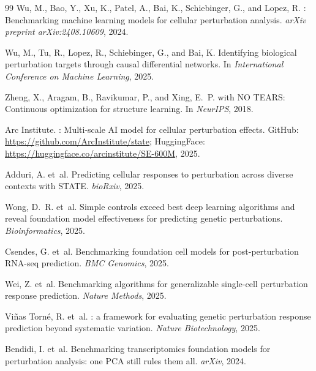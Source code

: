 \documentclass{article}
\theoremstyle{plain}
\theoremstyle{definition}
\theoremstyle{remark}
\begin{document}
\begin{thebibliography}{99}
Wu, M., Bao, Y., Xu, K., Patel, A., Bai, K., Schiebinger, G., and Lopez, R.
: Benchmarking machine learning models for cellular perturbation analysis.
\newblock \emph{arXiv preprint arXiv:2408.10609}, 2024.

Wu, M., Tu, R., Lopez, R., Schiebinger, G., and Bai, K.
\newblock Identifying biological perturbation targets through causal differential networks.
\newblock In \emph{International Conference on Machine Learning}, 2025.

Zheng, X., Aragam, B., Ravikumar, P., and Xing, E.~P.
 with {NO TEARS}: Continuous optimization for structure learning.
\newblock In \emph{NeurIPS}, 2018.

{Arc Institute}.
: Multi-scale {AI} model for cellular perturbation effects.
\newblock GitHub: \url{https://github.com/ArcInstitute/state}; HuggingFace: \url{https://huggingface.co/arcinstitute/SE-600M}, 2025.

Adduri, A. et~al.
\newblock Predicting cellular responses to perturbation across diverse contexts with {STATE}.
\newblock \emph{bioRxiv}, 2025.

Wong, D.~R. et~al.
\newblock Simple controls exceed best deep learning algorithms and reveal foundation model effectiveness for predicting genetic perturbations.
\newblock \emph{Bioinformatics}, 2025.

Csendes, G. et~al.
\newblock Benchmarking foundation cell models for post-perturbation {RNA}-seq prediction.
\newblock \emph{BMC Genomics}, 2025.

Wei, Z. et~al.
\newblock Benchmarking algorithms for generalizable single-cell perturbation response prediction.
\newblock \emph{Nature Methods}, 2025.

Vi{\~n}as Torn{\'e}, R. et~al.
: a framework for evaluating genetic perturbation response prediction beyond systematic variation.
\newblock \emph{Nature Biotechnology}, 2025.

Bendidi, I. et~al.
\newblock Benchmarking transcriptomics foundation models for perturbation analysis: one {PCA} still rules them all.
\newblock \emph{arXiv}, 2024.


\end{thebibliography}
\end{document}
